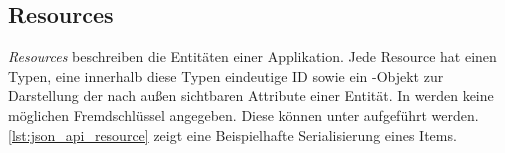 \subsection{Resources}
\label{sec:gj_resources}

\emph{Resources} beschreiben die Entitäten einer
Applikation.  Jede Resource hat einen Typen, eine innerhalb diese Typen
eindeutige ID sowie ein -Objekt zur Darstellung der nach außen
sichtbaren Attribute einer Entität.  In  werden keine möglichen
Fremdschlüssel angegeben.  Diese können unter  aufgeführt
werden.  \cref{lst:json_api_resource} zeigt eine Beispielhafte Serialisierung
eines Items.



